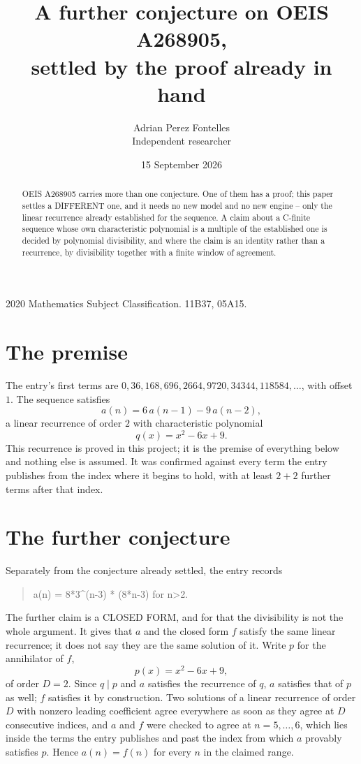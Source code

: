 \documentclass[11pt,a4paper]{article}
\title{A further conjecture on OEIS A268905,\\ \large settled by the proof already in hand}
\author{Adrian Perez Fontelles\\ \small Independent researcher}
\date{15 September 2026}
\theoremstyle{plain}
\theoremstyle{definition}
\begin{document}
\maketitle

\begin{abstract}
OEIS A268905 carries more than one conjecture. One of them has a proof; this paper settles a
DIFFERENT one, and it needs no new model and no new engine -- only the linear recurrence already
established for the sequence. A claim about a C-finite sequence whose own characteristic
polynomial is a multiple of the established one is decided by polynomial divisibility, and where
the claim is an identity rather than a recurrence, by divisibility together with a finite window
of agreement.
\end{abstract}

\noindent\small 2020 Mathematics Subject Classification. 11B37, 05A15.\normalsize

\section{The premise}

The entry's first terms are $0, 36, 168, 696, 2664, 9720, 34344, 118584,\dots$, with offset $1$. The sequence satisfies
\[
  a(n)=6\,a(n-1) - 9\,a(n-2) ,
\]
a linear recurrence of order $2$ with characteristic polynomial
\[
  q(x)=x^{2} - 6 x + 9 .
\]
This recurrence is proved in this project; it is the premise of everything below and nothing else is assumed.
It was confirmed against every term the entry publishes from the index where it begins to hold,
with at least $2+2$ further terms after that index.

\section{The further conjecture}

Separately from the conjecture already settled, the entry records

\begin{quote}\raggedright a(n) = 8*3\^{}(n-3) * (8*n-3) for n>2.\end{quote}

The further claim is a CLOSED FORM, and for that the divisibility is not the whole argument. It
gives that $a$ and the closed form $f$ satisfy the same linear recurrence; it does not say they
are the same solution of it. Write $p$ for the annihilator of $f$,
\[
  p(x)=x^{2} - 6 x + 9 ,
\]
of order $D=2$. Since $q\mid p$ and $a$ satisfies the recurrence of $q$, $a$ satisfies that of
$p$ as well; $f$ satisfies it by construction. Two solutions of a linear recurrence of order $D$
with nonzero leading coefficient agree everywhere as soon as they agree at $D$ consecutive
indices, and $a$ and $f$ were checked to agree at $n=5,\dots,6$,
which lies inside the terms the entry publishes and past the index from which $a$ provably
satisfies $p$. Hence $a(n)=f(n)$ for every $n$ in the claimed range.
\end{document}
